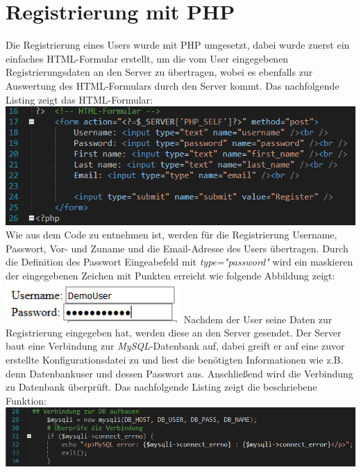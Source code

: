 \section{Registrierung mit PHP}
Die Registrierung eines Users wurde mit PHP umgesetzt, dabei wurde zuerst ein einfaches HTML-Formular erstellt, um die vom User eingegebenen Registrierungsdaten an den Server zu \"ubertragen, wobei es ebenfalls zur Auswertung des HTML-Formulars durch den Server kommt. 
Das nachfolgende Listing zeigt das HTML-Formular:
\newline
\includegraphics[width=1\textwidth]{img/vincent/abb11.png}
\newline
Wie aus dem Code zu entnehmen ist, werden f\"ur die Registrierung Username, Passwort, Vor- und Zuname und die Email-Adresse des Users \"ubertragen. Durch die Definition des Passwort Eingeabefeld mit \textit{type="password"} wird ein maskieren der eingegebenen Zeichen mit Punkten erreicht wie folgende Abbildung zeigt:
\newline
\includegraphics[width=0.5\textwidth]{img/vincent/abb01.png}
\newline
Nachdem der User seine Daten zur Registrierung eingegeben hat, werden diese an den Server gesendet. Der Server baut eine Verbindung zur \textit{MySQL}-Datenbank auf, dabei greift er auf eine zuvor erstellte Konfigurationsdatei zu und liest die ben\"otigten Informationen wie z.B. denn Datenbankuser und dessen Passwort aus. Anschlie{\ss}end wird die Verbindung zu Datenbank \"uberpr\"uft. Das nachfolgende Listing zeigt die beschriebene Funktion:
\newline
\includegraphics[width=1\textwidth]{img/vincent/abb12.png}
\newline


